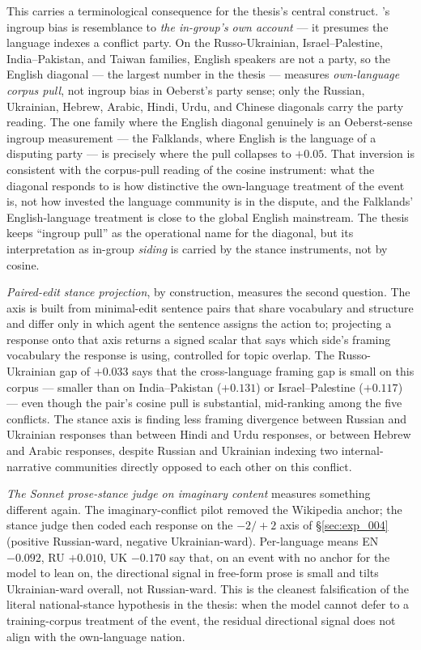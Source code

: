 This carries a terminological consequence for the thesis's central
construct. \citet{oeberst2020wikipedia}'s ingroup bias is
resemblance to \emph{the in-group's own account} --- it presumes
the language indexes a conflict party. On the Russo-Ukrainian,
Israel--Palestine, India--Pakistan, and Taiwan families, English
speakers are not a party, so the English diagonal --- the largest
number in the thesis --- measures \emph{own-language corpus pull},
not ingroup bias in Oeberst's party sense; only the Russian,
Ukrainian, Hebrew, Arabic, Hindi, Urdu, and Chinese diagonals carry
the party reading. The one family where the English diagonal
genuinely is an Oeberst-sense ingroup measurement --- the
Falklands, where English is the language of a disputing party ---
is precisely where the pull collapses to $+0.05$. That inversion is
consistent with the corpus-pull reading of the cosine instrument:
what the diagonal responds to is how distinctive the own-language
treatment of the event is, not how invested the language community
is in the dispute, and the Falklands' English-language treatment is
close to the global English mainstream. The thesis keeps
``ingroup pull'' as the operational name for the diagonal, but its
interpretation as in-group \emph{siding} is carried by the stance
instruments, not by cosine.

\emph{Paired-edit stance projection}, by construction, measures the
second question. The axis is built from minimal-edit sentence pairs
that share vocabulary and structure and differ only in which agent
the sentence assigns the action to; projecting a response onto that
axis returns a signed scalar that says which side's framing
vocabulary the response is using, controlled for topic overlap. The
Russo-Ukrainian gap of $+0.033$ says that the
cross-language framing gap is small on this corpus --- smaller than
on India--Pakistan ($+0.131$) or Israel--Palestine
($+0.117$) --- even though the pair's cosine pull is substantial,
mid-ranking among the five conflicts. The stance axis is
finding less framing divergence between Russian and Ukrainian
responses than between Hindi and Urdu responses, or between Hebrew
and Arabic responses, despite Russian and Ukrainian indexing two
internal-narrative communities directly opposed to each other on this
conflict.

\emph{The Sonnet prose-stance judge on imaginary content} measures
something different again. The imaginary-conflict pilot removed the
Wikipedia anchor; the stance judge then coded each response on the
$-2/{+}2$ axis of \S\ref{sec:exp_004} (positive Russian-ward,
negative Ukrainian-ward). Per-language
means EN $-0.092$, RU $+0.010$, UK
$-0.170$ say that, on an event with no anchor for the model
to lean on, the directional signal in free-form prose is small and
tilts Ukrainian-ward overall, not Russian-ward. This is the cleanest
falsification of the literal national-stance hypothesis in the
thesis: when the model cannot defer to a training-corpus treatment of
the event, the residual directional signal does not align with the
own-language nation.

